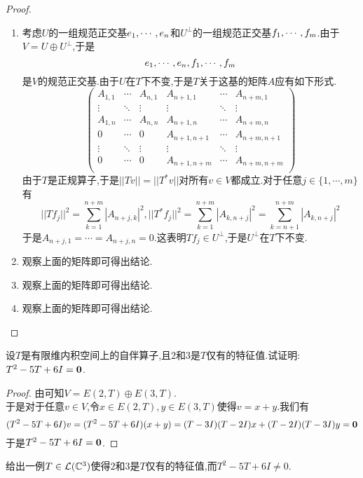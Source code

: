 \documentclass{ctexart}
\begin{document}
\begin{proof}
    \begin{enumerate}[label=\tbf{(\arabic*)}]
        \item 考虑$U$的一组规范正交基${e}_1,\cdots,{e}_{n}$和$U^\bot$的一组规范正交基${f}_1,\cdots,{f}_{m}$.由于$V=U\oplus U^\bot$,于是
            \[{e}_1,\cdots,{e}_{n},{f}_1,\cdots,{f}_{m}\]
            是$V$的规范正交基.由于$U$在$T$下不变,于是$T$关于这基的矩阵$A$应有如下形式.
            \[\begin{pmatrix}
                A_{1,1}&\cdots&A_{n,1}&A_{n+1,1}&\cdots&A_{n+m,1}\\
                \vdots&\ddots&\vdots&\vdots&\ddots&\vdots\\
                A_{1,n}&\cdots&A_{n,n}&A_{n+1,n}&\cdots&A_{n+m,n}\\
                0&\cdots&0&A_{n+1,n+1}&\cdots&A_{n+m,n+1}\\
                \vdots&\ddots&\vdots&\vdots&\ddots&\vdots\\
                0&\cdots&0&A_{n+1,n+m}&\cdots&A_{n+m,n+m}\\
            \end{pmatrix}\]
            由于$T$是正规算子,于是$||Tv||=||T^*v||$对所有$v\in V$都成立.对于任意$j\in\{1,\cdots,m\}$有
            \[||Tf_j||^2=\sum_{k=1}^{n+m}|A_{n+j,k}|^2,||T^*f_j||^2=\sum_{k=1}^{n+m}|A_{k,n+j}|^2=\sum_{k=n+1}^{n+m}|A_{k,n+j}|^2\]
            于是$A_{n+j,1}=\cdots=A_{n+j,n}=0$.这表明$Tf_j\in U^\bot$,于是$U^\bot$在$T$下不变.
        \item 观察上面的矩阵即可得出结论.
        \item 观察上面的矩阵即可得出结论.
        \item 观察上面的矩阵即可得出结论.
    \end{enumerate}
\end{proof}
\begin{problem}[21.]
    设$T$是有限维内积空间上的自伴算子,且$2$和$3$是$T$仅有的特征值.试证明:$T^2-5T+6I=\mathbf0$.
\end{problem}
\begin{proof}
    由可知$V=E(2,T)\oplus E(3,T)$.\\
    于是对于任意$v\in V$,令$x\in E(2,T),y\in E(3,T)$使得$v=x+y$.我们有
    \[(T^2-5T+6I)v=(T^2-5T+6I)(x+y)=(T-3I)(T-2I)x+(T-2I)(T-3I)y=\mathbf0\]
    于是$T^2-5T+6I=\mathbf0$.
\end{proof}
\begin{problem}[22.]
    给出一例$T\in\mathcal{L}(\mathbb{C}^3)$使得$2$和$3$是$T$仅有的特征值,而$T^2-5T+6I\neq0$.
\end{problem}
\end{document}
